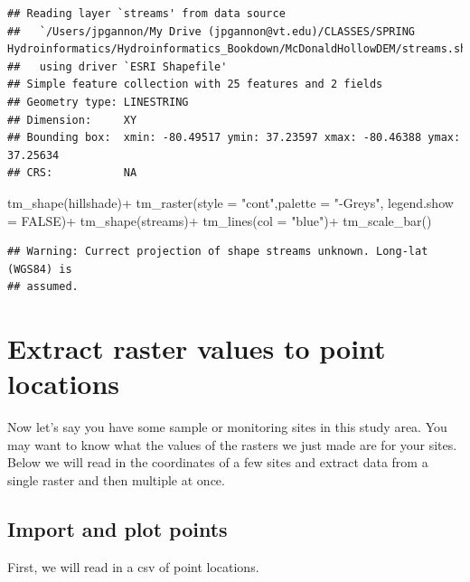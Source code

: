\documentclass[
]{book}
\newenvironment{Shaded}{\begin{snugshade}}{\end{snugshade}}
\newcommand{\AttributeTok}[1]{\textcolor[rgb]{0.77,0.63,0.00}{#1}}
\newcommand{\ConstantTok}[1]{\textcolor[rgb]{0.00,0.00,0.00}{#1}}
\newcommand{\FunctionTok}[1]{\textcolor[rgb]{0.00,0.00,0.00}{#1}}
\newcommand{\NormalTok}[1]{#1}
\newcommand{\SpecialCharTok}[1]{\textcolor[rgb]{0.00,0.00,0.00}{#1}}
\newcommand{\StringTok}[1]{\textcolor[rgb]{0.31,0.60,0.02}{#1}}
\begin{document}
\begin{verbatim}
## Reading layer `streams' from data source 
##   `/Users/jpgannon/My Drive (jpgannon@vt.edu)/CLASSES/SPRING Hydroinformatics/Hydroinformatics_Bookdown/McDonaldHollowDEM/streams.shp' 
##   using driver `ESRI Shapefile'
## Simple feature collection with 25 features and 2 fields
## Geometry type: LINESTRING
## Dimension:     XY
## Bounding box:  xmin: -80.49517 ymin: 37.23597 xmax: -80.46388 ymax: 37.25634
## CRS:           NA
\end{verbatim}

\begin{Shaded}
\begin{Highlighting}[]
\FunctionTok{tm\_shape}\NormalTok{(hillshade)}\SpecialCharTok{+}
  \FunctionTok{tm\_raster}\NormalTok{(}\AttributeTok{style =} \StringTok{"cont"}\NormalTok{,}\AttributeTok{palette =} \StringTok{"{-}Greys"}\NormalTok{, }\AttributeTok{legend.show =} \ConstantTok{FALSE}\NormalTok{)}\SpecialCharTok{+}
\FunctionTok{tm\_shape}\NormalTok{(streams)}\SpecialCharTok{+}
  \FunctionTok{tm\_lines}\NormalTok{(}\AttributeTok{col =} \StringTok{"blue"}\NormalTok{)}\SpecialCharTok{+}
  \FunctionTok{tm\_scale\_bar}\NormalTok{()}
\end{Highlighting}
\end{Shaded}

\begin{verbatim}
## Warning: Currect projection of shape streams unknown. Long-lat (WGS84) is
## assumed.
\end{verbatim}

\hypertarget{extract-raster-values-to-point-locations}{%
\section{Extract raster values to point locations}\label{extract-raster-values-to-point-locations}}

Now let's say you have some sample or monitoring sites in this study area. You may want to know what the values of the rasters we just made are for your sites. Below we will read in the coordinates of a few sites and extract data from a single raster and then multiple at once.

\hypertarget{import-and-plot-points}{%
\subsection{Import and plot points}\label{import-and-plot-points}}

First, we will read in a csv of point locations.
\end{document}
